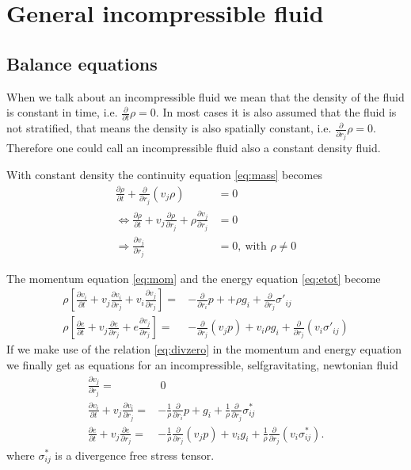 \documentclass[a4paper,
					12pt,
					twoside,
					pagesize,
					cleardoubleplain,
					headsepline,
					bibtotoc
					]{scrbook}
\newcommand{\lrb}[1]{{ \left[ #1 \right] }}
\newcommand{\pd}[1]{\frac{\partial}{\partial #1}}
\newcommand{\ppd}[2]{\frac{\partial #2}{\partial #1}}
\begin{document}
\chapter{General incompressible fluid}
\section{Balance equations}
When we talk about an incompressible fluid we mean that the density of the fluid
is constant in time, i.e. $\pd{t}\rho=0$. In most cases it is also assumed that 
the fluid is not stratified, that means the density is also spatially constant,
i.e. $\pd{r_j}\rho=0$. Therefore one could call an incompressible fluid also a
constant density fluid.

With constant density the continuity equation \eqref{eq:mass} becomes
\begin{align}
\ppd{t}{\rho} + \pd{r_j}(v_j \rho) &= 0 \\
\Leftrightarrow \ppd{t}{\rho}+ v_j \ppd{r_j}{\rho} + \rho \ppd{r_j}{v_j} &= 0\\
\Rightarrow \ppd{r_j}{v_j} &= 0,\ \text{with $\rho\neq 0$} \label{eq:divzero}
\end{align}

The momentum equation \eqref{eq:mom} and the energy equation
\eqref{eq:etot} 
become
\begin{align}
\rho \lrb{\ppd{t}{v_i} + v_j \ppd{r_j}{v_i} + v_i \ppd{r_j}{v_j}}  
=& -\pd{r_i}p + +\rho g_i+ \pd{r_j}\sigma'_{ij} \\
\rho \lrb{\ppd{t}{e} + v_j \ppd{r_j}{e} + e \ppd{r_j}{v_j}} 
=& -\pd{r_j}(v_j p) + v_i \rho g_i +\pd{r_j}(v_i \sigma'_{ij})
\end{align}
If we make use of the relation \eqref{eq:divzero} in the momentum and energy 
equation we finally get as equations for an incompressible, selfgravitating, 
newtonian fluid
\begin{align}
\ppd{r_j}{v_j} =&\ 0\\
\ppd{t}{v_i} + v_j \ppd{r_j}{v_i} =& -\frac{1}{\rho}\pd{r_i}p + g_i
+\frac{1}{\rho}\pd{r_j}\sigma^*_{ij}\\
\ppd{t}{e} + v_j \ppd{r_j}{e} =& -\frac{1}{\rho} \pd{r_j}(v_j p) + v_i g_i
+\frac{1}{\rho}\pd{r_j}(v_i \sigma^*_{ij}).
\end{align}
where $\sigma^*_{ij}$ is a divergence free stress tensor.
\end{document}
